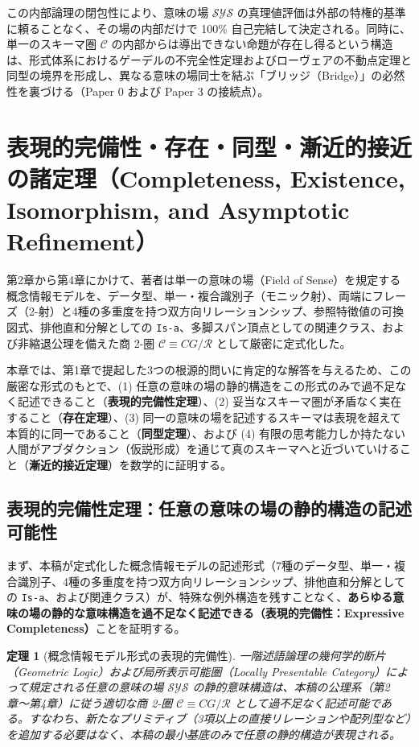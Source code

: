 \documentclass[11pt,a4paper]{ltjsarticle}
\theoremstyle{definition}
\theoremstyle{plain}
\newtheorem{theorem}{定理}[section]
\theoremstyle{remark}
\begin{document}
この内部論理の閉包性により、意味の場 $\mathcal{SYS}$ の真理値評価は外部の特権的基準に頼ることなく、その場の内部だけで 100\% 自己完結して決定される。同時に、単一のスキーマ圏 $\mathcal{C}$ の内部からは導出できない命題が存在し得るという構造は、形式体系におけるゲーデルの不完全性定理およびローヴェアの不動点定理と同型の境界を形成し、異なる意味の場同士を結ぶ「ブリッジ（Bridge）」の必然性を裏づける（Paper 0 および Paper 3 の接続点）。

\section{表現的完備性・存在・同型・漸近的接近の諸定理（Completeness, Existence, Isomorphism, and Asymptotic Refinement）}

第2章から第4章にかけて、著者は単一の意味の場（Field of Sense）を規定する概念情報モデルを、データ型、単一・複合識別子（モニック射）、両端にフレーズ（2-射）と4種の多重度を持つ双方向リレーションシップ、参照特徴値の可換図式、排他直和分解としての \texttt{Is-a}、多脚スパン頂点としての関連クラス、および非縮退公理を備えた商 2-圏 $\mathcal{C} \equiv CG/\mathcal{R}$ として厳密に定式化した。

本章では、第1章で提起した3つの根源的問いに肯定的な解答を与えるため、この厳密な形式のもとで、(1) 任意の意味の場の静的構造をこの形式のみで過不足なく記述できること（\textbf{表現的完備性定理}）、(2) 妥当なスキーマ圏が矛盾なく実在すること（\textbf{存在定理}）、(3) 同一の意味の場を記述するスキーマは表現を超えて本質的に同一であること（\textbf{同型定理}）、および (4) 有限の思考能力しか持たない人間がアブダクション（仮説形成）を通じて真のスキーマへと近づいていけること（\textbf{漸近的接近定理}）を数学的に証明する。

\subsection{表現的完備性定理：任意の意味の場の静的構造の記述可能性}
まず、本稿が定式化した概念情報モデルの記述形式（7種のデータ型、単一・複合識別子、4種の多重度を持つ双方向リレーションシップ、排他直和分解としての \texttt{Is-a}、および関連クラス）が、特殊な例外構造を残すことなく、\textbf{あらゆる意味の場の静的な意味構造を過不足なく記述できる（表現的完備性：Expressive Completeness）}ことを証明する。

\begin{theorem}[概念情報モデル形式の表現的完備性]\label{thm:completeness}
一階述語論理の幾何学的断片（Geometric Logic）および局所表示可能圏（Locally Presentable Category）によって規定される任意の意味の場 $\mathcal{SYS}$ の静的意味構造は、本稿の公理系（第2章〜第4章）に従う適切な商 2-圏 $\mathcal{C} \equiv CG/\mathcal{R}$ として過不足なく記述可能である。すなわち、新たなプリミティブ（3項以上の直接リレーションや配列型など）を追加する必要はなく、本稿の最小基底のみで任意の静的構造が表現される。
\end{theorem}
\end{document}
